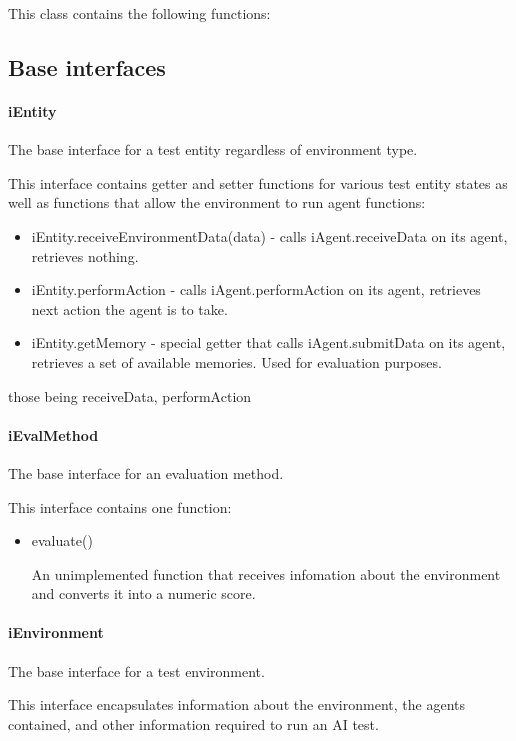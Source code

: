 \documentclass[masterthesis]{fer}
\begin{document}
This class contains the following functions:

\subsection{Base interfaces}
\paragraph{iEntity}
The base interface for a test entity regardless of environment type.

This interface contains getter and setter functions for various test entity states
as well as functions that allow the environment to run agent functions:
\begin{itemize}
\item{iEntity.receiveEnvironmentData(data)} - calls iAgent.receiveData on its agent, retrieves nothing.
\item{iEntity.performAction} - calls iAgent.performAction on its agent, retrieves next action the agent is to take.
\item{iEntity.getMemory} - special getter that calls iAgent.submitData on its agent, retrieves a set of available memories. Used for evaluation purposes.
\end{itemize}
those being receiveData, performAction
\paragraph{iEvalMethod}
The base interface for an evaluation method.

This interface contains one function:
\begin{itemize}
\item{evaluate()}

An unimplemented function that receives infomation about the environment and converts it into a numeric score.
\end{itemize} 
\paragraph{iEnvironment}
The base interface for a test environment.

This interface encapsulates information about the environment, the agents contained, and other information required to run an AI test.
\end{document}
